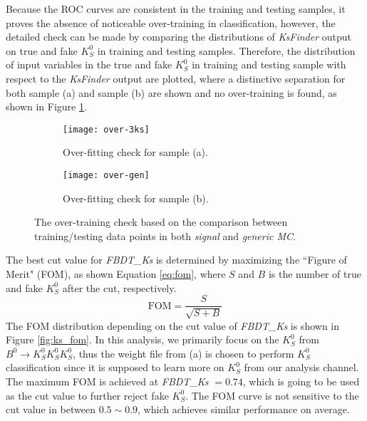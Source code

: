 Because the ROC curves are consistent in the training and testing samples, it proves the absence of noticeable over-training in classification, however, the detailed check can be made by comparing the distributions of \textit{KsFinder} output on true and fake $K_S^0$ in training and testing samples. Therefore, the distribution of input variables in the true and fake $K_S^0$ in training and testing sample with respect to the \textit{KsFinder} output are plotted, where a distinctive separation for both sample (a) and sample (b) are shown and no over-training is found, as shown in Figure \ref{fig:ks_overtraining}.
\begin{figure}[htpb]
	\begin{subfigure}{1\linewidth}
		\centering
		\texttt{[image: over-3ks]}
		\caption{Over-fitting check for sample (a).}
	\end{subfigure}
  	\vspace{0.3cm}

	\begin{subfigure}{1\linewidth}
		\centering
		\texttt{[image: over-gen]}
		\caption{Over-fitting check for sample (b).}
	\end{subfigure}
\caption{The over-training check based on the comparison between training/testing data points in both \textit{signal} and \textit{generic MC}.}
\label{fig:ks_overtraining}
	\vspace{0.3cm}
	
\end{figure}


The best cut value for \textit{FBDT\_Ks} is determined by maximizing the ``Figure of Merit" (FOM), as shown Equation \ref{eq:fom}, where $S$ and $B$ is the number of true and fake $K_S^0$ after the cut, respectively.
\begin{equation}\label{eq:fom}
\text{FOM} = \frac{S}{\sqrt{S+B}}
\end{equation}
 The FOM distribution depending on the cut value of \textit{FBDT\_Ks} is shown in Figure \ref{fig:ks_fom}. In this analysis, we primarily focus on the $K_S^0$ from $B^0 \to K_S^0  K_S^0  K_S^0$, thus the weight file from (a) is chosen to perform $K_S^0$ classification since it is supposed to learn more on $K_S^0$ from our analysis channel. The maximum FOM is achieved at \textit{FBDT\_Ks} $= 0.74$, which is going to be used as the cut value to further reject fake $K_S^0$. The FOM curve is not sensitive to the cut value in between $0.5 \sim 0.9$, which achieves similar performance on average.

